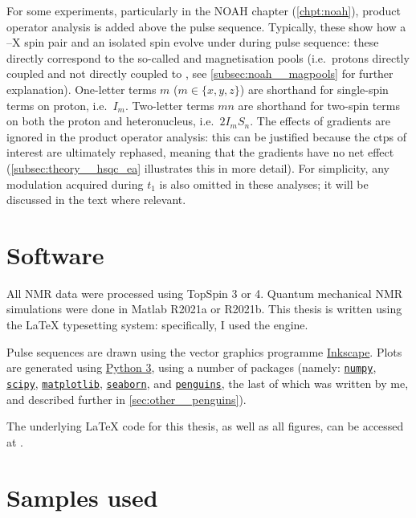 For some experiments, particularly in the NOAH chapter (\cref{chpt:noah}), product operator analysis is added above the pulse sequence.
Typically, these show how a \proton{}--X spin pair and an isolated \proton{} spin evolve under during pulse sequence: these directly correspond to the so-called  and  magnetisation pools (i.e.\ protons directly coupled and not directly coupled to \carbon{}, see \cref{subsec:noah__magpools} for further explanation).
One-letter terms $m$ ($m \in \{x, y, z\}$) are shorthand for single-spin terms on proton, i.e.\ $I_m$.
Two-letter terms $mn$ are shorthand for two-spin terms on both the proton and heteronucleus, i.e.\ $2I_mS_n$.
The effects of gradients are ignored in the product operator analysis: this can be justified because the \acp{ctp} of interest are ultimately rephased, meaning that the gradients have no net effect (\cref{subsec:theory__hsqc_ea} illustrates this in more detail).
For simplicity, any modulation acquired during $t_1$ is also omitted in these analyses; it will be discussed in the text where relevant.

\section*{Software}

All NMR data were processed using TopSpin 3 or 4.
Quantum mechanical NMR simulations were done in Matlab R2021a or R2021b.
This thesis is written using the \LaTeX{} typesetting system: specifically, I used the \LuaLaTeX{} engine.

Pulse sequences are drawn using the vector graphics programme \href{https://inkscape.org/}{Inkscape}.
Plots are generated using \href{https://www.python.org/}{Python 3}, using a number of packages (namely: \href{https://github.com/numpy/numpy}{\texttt{numpy}}, \href{https://github.com/scipy/scipy}{\texttt{scipy}}, \href{https://github.com/matplotlib/matplotlib}{\texttt{matplotlib}}, \href{https://github.com/mwaskom/seaborn}{\texttt{seaborn}}, and \href{https://github.com/yongrenjie/penguins}{\texttt{penguins}}, the last of which was written by me, and described further in \cref{sec:other__penguins}).

The underlying \LaTeX{} code for this thesis, as well as all figures, can be accessed at .

\section*{Samples used}

